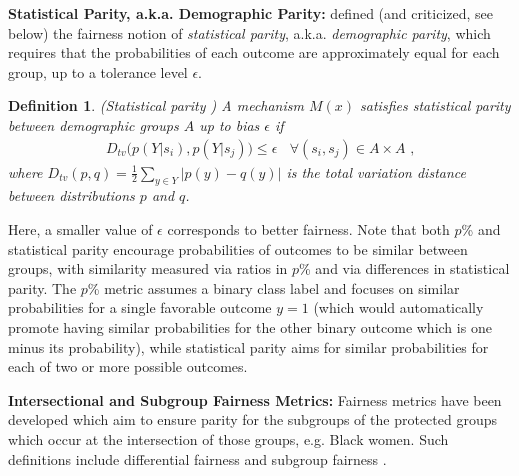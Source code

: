\documentclass[11pt,dvipdfm]{article}
\newtheorem{dfn}[theorem]{Definition}
\begin{document}
\noindent \textbf{Statistical Parity, a.k.a. Demographic Parity:}  \cite{dwork2012fairness} defined (and criticized, see below) the fairness notion of \emph{statistical parity}, a.k.a. \emph{demographic parity}, which requires that the probabilities of each outcome are approximately equal for each group, up to a tolerance level $\epsilon$. %
\begin{dfn} (Statistical parity \cite{dwork2012fairness}) A mechanism $M(x)$ satisfies \emph{statistical parity} between demographic groups $A$ up to bias $\epsilon$ if
\begin{align}
    D_{tv}\big ( p(Y|s_i), p(Y|s_j) \big ) \leq \epsilon \ \ \ \ \forall (s_i,s_j) \in A \times A \mbox{ ,}
\end{align}
where $D_{tv}(p,q) = \frac{1}{2} \sum_{y \in Y}|p(y) - q(y)|$ is the total variation distance between distributions $p$ and $q$.
\end{dfn}
Here, a smaller value of $\epsilon$ corresponds to better fairness. Note that both $p$\% and statistical parity encourage probabilities of outcomes to be similar between groups, with similarity measured via ratios in $p$\% and via differences in statistical parity.  The $p$\% metric assumes a binary class label and focuses on similar probabilities for a single favorable outcome $y=1$ (which would automatically promote having similar probabilities for the other binary outcome which is one minus its probability), while statistical parity aims for similar probabilities for each of two or more possible outcomes. 

\noindent \textbf{Intersectional and Subgroup Fairness Metrics:} Fairness metrics have been developed which aim to ensure parity for the subgroups of the protected groups which occur at the intersection of those groups, e.g. Black women. Such definitions include differential fairness \cite{foulds2020intersectional} and subgroup fairness \cite{kearns2018preventing}.
\end{document}
